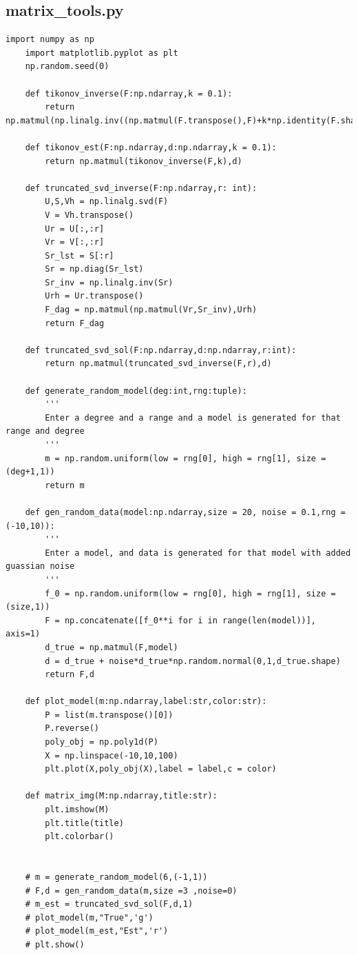 \documentclass{article}
\begin{document}
\subsection{matrix\_tools.py}
\begin{lstlisting}[style=python]
    import numpy as np
    import matplotlib.pyplot as plt
    np.random.seed(0)
    
    def tikonov_inverse(F:np.ndarray,k = 0.1):
        return np.matmul(np.linalg.inv((np.matmul(F.transpose(),F)+k*np.identity(F.shape[1]))),F.transpose())
    
    def tikonov_est(F:np.ndarray,d:np.ndarray,k = 0.1):
        return np.matmul(tikonov_inverse(F,k),d)
    
    def truncated_svd_inverse(F:np.ndarray,r: int):
        U,S,Vh = np.linalg.svd(F)
        V = Vh.transpose()
        Ur = U[:,:r]
        Vr = V[:,:r]
        Sr_lst = S[:r]
        Sr = np.diag(Sr_lst)
        Sr_inv = np.linalg.inv(Sr)
        Urh = Ur.transpose()
        F_dag = np.matmul(np.matmul(Vr,Sr_inv),Urh)
        return F_dag
    
    def truncated_svd_sol(F:np.ndarray,d:np.ndarray,r:int):
        return np.matmul(truncated_svd_inverse(F,r),d)
    
    def generate_random_model(deg:int,rng:tuple):
        '''
        Enter a degree and a range and a model is generated for that range and degree
        '''
        m = np.random.uniform(low = rng[0], high = rng[1], size = (deg+1,1))
        return m
    
    def gen_random_data(model:np.ndarray,size = 20, noise = 0.1,rng = (-10,10)):
        '''
        Enter a model, and data is generated for that model with added guassian noise
        '''
        f_0 = np.random.uniform(low = rng[0], high = rng[1], size = (size,1))
        F = np.concatenate([f_0**i for i in range(len(model))], axis=1)
        d_true = np.matmul(F,model) 
        d = d_true + noise*d_true*np.random.normal(0,1,d_true.shape)
        return F,d
    
    def plot_model(m:np.ndarray,label:str,color:str):
        P = list(m.transpose()[0])
        P.reverse()
        poly_obj = np.poly1d(P)
        X = np.linspace(-10,10,100)
        plt.plot(X,poly_obj(X),label = label,c = color)   
    
    def matrix_img(M:np.ndarray,title:str):
        plt.imshow(M)
        plt.title(title)
        plt.colorbar()
    
    
    # m = generate_random_model(6,(-1,1))
    # F,d = gen_random_data(m,size =3 ,noise=0)
    # m_est = truncated_svd_sol(F,d,1)
    # plot_model(m,"True",'g')
    # plot_model(m_est,"Est",'r')
    # plt.show()
\end{lstlisting}
\end{document}
